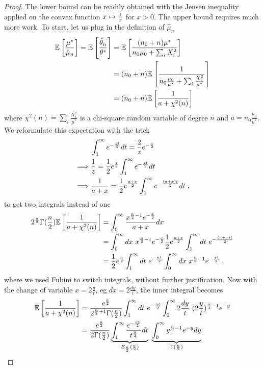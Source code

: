 \documentclass{article}
\newcommand*{\expect}[2][]{\ensuremath{\mathbb{E}_{#1} \left[ #2 \right] }} %
\newcommand{\natp}{\theta}
\newcommand{\MAPm}{\hat \mu_n}
\newcommand{\MAPt}{\hat \natp_n}
\begin{document}
\begin{proof}
	The lower bound can be readily obtained with the Jensen inequality applied on the convex function $x\mapsto\inv{x}$ for $x>0$.
	The upper bound requires much more work.
	To start, let us plug in the definition of $\MAPm$
	\begin{align}
		\expect{\frac{\mu^*}{\MAPm}} 
		= \expect{\frac{\MAPt}{\natp^*}} 
		&= \expect{\frac{(n_0+n) \mu^*}{n_0 \mu_0 + \sum_i X_i^2}}  \\
		&= (n_0 + n) \expect{\inv{n_0 \frac{\mu_0}{\mu^*}+ \sum_i \frac{X_i^2}{ \mu^*} }} \\
		&= (n_0 +n) \expect{\inv{a + \chi^2(n)}}
	\end{align}
	where $\chi^2(n) = \sum_i \frac{X_i^2}{ \mu^*}$ is a chi-square random variable of degree $n$ and $a=n_0 \frac{\mu_0}{\mu^*}$.
	We reformulate this expectation with the trick
	\begin{align}
		&\int_1^\infty e^{-\frac{zt}{2}} dt = \frac{2}{z} e^{-\half[z]} \\
		\implies &\inv{z} = \half e^{\half[z]} \int_1^\infty e^{-\frac{zt}{2}} dt \\
		\implies &\inv{a+x} = \half e^{\frac{a+x}{2}} \int_1^\infty e^{- \frac{(a+x)t}{2}}dt \; ,
	\end{align} 
	to get two integrals instead of one
	\begin{align}
		2^{\half[n]}\Gamma(\half[n]) \expect{\inv{a + \chi^2(n)}}  
		&= \int_0^\infty \frac{x^{\frac{n}{2}-1}e^{-\half[x]} }{a+x} dx \\
		&= \int_0^\infty dx\  x^{\frac{n}{2}-1}e^{-\half[x]} \half e^{\half[a+x]} \int_1^\infty  dt\  e^{-\half[(a+x)t]}  \\
		&= \half e^{\half[a]} \int_1^\infty dt \ e^{-\half[a t]}   \int_0^\infty dx \  x^{\frac{n}{2}-1} e^{-\half[x t]}  \; ,
	\end{align}
	where we used Fubini to switch integrals, without further justification.
	Now with the change of variable $x = 2\frac{y}{t}$, eg $dx = 2\frac{dy}{t}$, the inner integral becomes
	\begin{align}
		\expect{\inv{a + \chi^2(n)}}  
		&= \frac{e^{\half[a]} }{2^{\half[n]+1}\Gamma(\half[n]) }\int_1^\infty dt \ e^{-\half[a t]}   \int_0^\infty 2\frac{dy}{t} \  (2\frac{y}{t})^{\frac{n}{2}-1} e^{-y} \\
		&= \frac{e^{\half[a]} }{2\Gamma(\half[n]) } 
		\underbrace{\int_1^\infty  \frac{e^{-\half[a t]}}{t^{\frac{n}{2}}}  dt}_{E_{\half[n]}(\half[a])  } \ 
		\underbrace{\int_0^\infty  y^{\frac{n}{2}-1} e^{-y} dy}_{\Gamma(\half[n])}

\end{align}
\end{proof}
\end{document}
